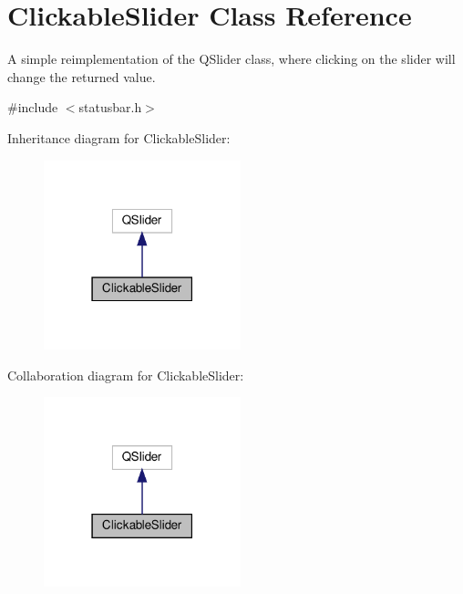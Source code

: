 \hypertarget{classClickableSlider}{}\section{Clickable\+Slider Class Reference}
\label{classClickableSlider}


A simple reimplementation of the Q\+Slider class, where clicking on the slider will change the returned value.  




{\ttfamily \#include $<$statusbar.\+h$>$}



Inheritance diagram for Clickable\+Slider\+:\nopagebreak
\begin{figure}[H]
\begin{center}
\leavevmode
\includegraphics[width=162pt]{classClickableSlider__inherit__graph}
\end{center}
\end{figure}


Collaboration diagram for Clickable\+Slider\+:\nopagebreak
\begin{figure}[H]
\begin{center}
\leavevmode
\includegraphics[width=162pt]{classClickableSlider__coll__graph}
\end{center}
\end{figure}
